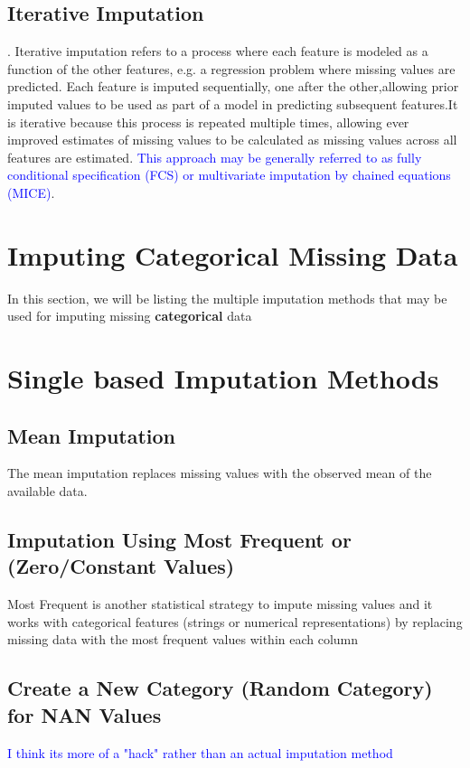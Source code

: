 \documentclass{article}
\begin{document}
\subsection{Iterative Imputation}
.  Iterative imputation refers to a process where each feature is modeled as a function of the other features, e.g.  a regression problem where missing values are predicted.  Each feature is imputed sequentially, one after the other,allowing prior imputed values to be used as part of a model in predicting subsequent features.It is iterative because this process is repeated multiple times, allowing ever improved estimates of missing values to be calculated as missing values across all features are estimated.  \textcolor{blue}{This approach may be generally referred to as fully conditional specification (FCS) or multivariate imputation by chained equations (MICE)}.

\section{Imputing Categorical Missing Data}
In this section, we will be listing the multiple imputation methods that may be used for imputing missing \textbf{categorical} data

\section*{Single based Imputation Methods}

\subsection{Mean Imputation}
The mean imputation replaces missing values with the observed mean of the available data.

\subsection{Imputation Using Most Frequent or (Zero/Constant Values)}
Most Frequent is another statistical strategy to impute missing values and it works with categorical features (strings or numerical representations) by replacing missing data with the most frequent values within each column

\subsection{Create a New Category (Random Category) for NAN Values}
\textcolor{blue}{I think its more of a "hack" rather than an actual imputation method}
\end{document}
